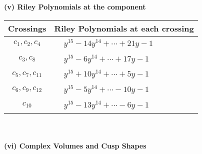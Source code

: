 \documentclass[1p]{elsarticle_modified}
\theoremstyle{definition}
\begin{document}
\newpage\renewcommand{\arraystretch}{1}
\flushleft \textbf{(v) Riley Polynomials at the component}\newline \\
\begin{tabular}{m{50pt}|m{274pt}}
Crossings & \hspace{64pt}Riley Polynomials at each crossing \\
\hline $$\begin{aligned}c_{1},c_{2},c_{4}\end{aligned}$$&$\begin{aligned}
&y^{15}-14 y^{14}+\cdots+21 y-1
\end{aligned}$\\
\hline $$\begin{aligned}c_{3},c_{8}\end{aligned}$$&$\begin{aligned}
&y^{15}-6 y^{14}+\cdots+17 y-1
\end{aligned}$\\
\hline $$\begin{aligned}c_{5},c_{7},c_{11}\end{aligned}$$&$\begin{aligned}
&y^{15}+10 y^{14}+\cdots+5 y-1
\end{aligned}$\\
\hline $$\begin{aligned}c_{6},c_{9},c_{12}\end{aligned}$$&$\begin{aligned}
&y^{15}-5 y^{14}+\cdots-10 y-1
\end{aligned}$\\
\hline $$\begin{aligned}c_{10}\end{aligned}$$&$\begin{aligned}
&y^{15}-13 y^{14}+\cdots-6 y-1
\end{aligned}$\\
\hline
\end{tabular}\\~\\
\newpage\flushleft \textbf{(vi) Complex Volumes and Cusp Shapes}
\end{document}
